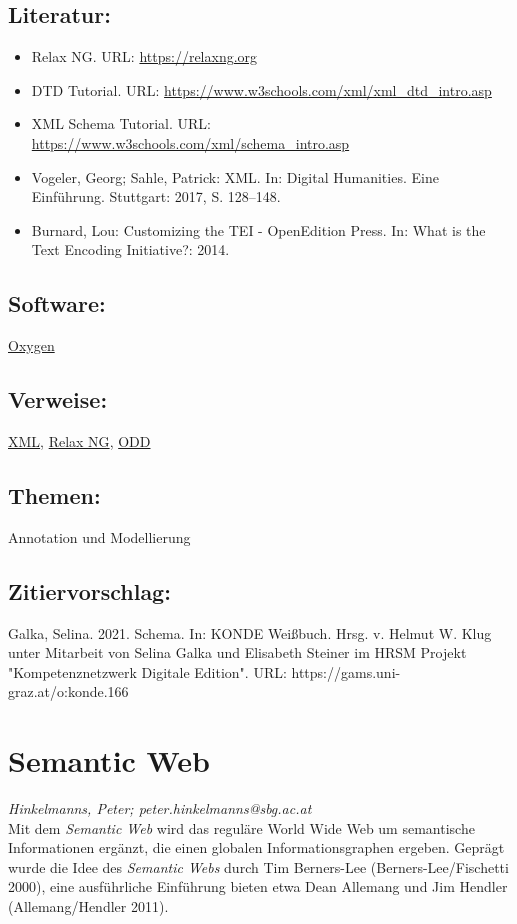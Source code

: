 \documentclass{article}
\begin{document}
        \subsection*{Literatur:}\begin{itemize}\item Relax NG. URL: \url{https://relaxng.org}\item DTD Tutorial. URL: \url{https://www.w3schools.com/xml/xml_dtd_intro.asp}\item XML Schema Tutorial. URL: \url{https://www.w3schools.com/xml/schema_intro.asp}\item Vogeler, Georg; Sahle, Patrick: XML. In: Digital Humanities. Eine Einführung. Stuttgart: 2017, S. 128–148.\item Burnard, Lou: Customizing the TEI - OpenEdition Press. In: What is the Text Encoding Initiative?: 2014.\end{itemize}\subsection*{Software:}\href{http://oxygenxml.com/}{Oxygen}\subsection*{Verweise:}\href{https://gams.uni-graz.at/o:konde.215}{XML}, \href{https://gams.uni-graz.at/o:konde.163}{Relax NG}, \href{https://gams.uni-graz.at/o:konde.150}{ODD}\subsection*{Themen:}Annotation und Modellierung\subsection*{Zitiervorschlag:}Galka, Selina. 2021. Schema. In: KONDE Weißbuch. Hrsg. v. Helmut W. Klug unter Mitarbeit von Selina Galka und Elisabeth Steiner im HRSM Projekt "Kompetenznetzwerk Digitale Edition". URL: https://gams.uni-graz.at/o:konde.166\newpage\section*{Semantic Web} \emph{Hinkelmanns, Peter; peter.hinkelmanns@sbg.ac.at }\\
        
    Mit dem \emph{Semantic Web} wird das reguläre World Wide Web um
                  semantische Informationen ergänzt, die einen globalen Informationsgraphen ergeben.
                  Geprägt wurde die Idee des \emph{Semantic Webs} durch Tim
                  Berners-Lee (Berners-Lee/Fischetti 2000), eine ausführliche
                  Einführung bieten etwa Dean Allemang und Jim Hendler (Allemang/Hendler
                     2011).\\
            
\end{document}
